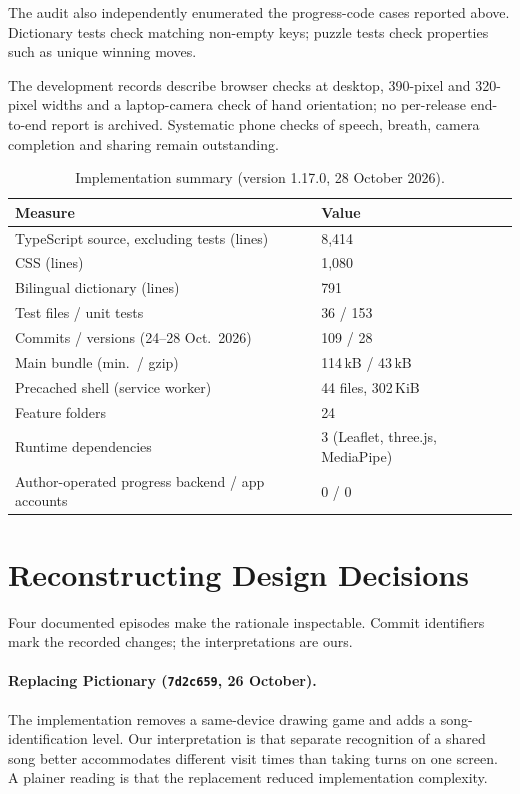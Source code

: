 \documentclass[sigconf,nonacm]{acmart}
\newcommand{\code}[1]{\textnormal{\texttt{\small #1}}}
\begin{document}
The audit also independently enumerated the progress-code cases reported above. Dictionary tests
check matching non-empty keys; puzzle tests check properties such as unique winning moves.

The development records describe browser checks at desktop, 390-pixel and 320-pixel widths and a
laptop-camera check of hand orientation; no per-release end-to-end report is archived. Systematic
phone checks of speech, breath, camera completion and sharing remain outstanding.

\begin{table}[t]
  \caption{Implementation summary (version 1.17.0, 28 October 2026).}
  \label{tab:metrics}
  \small
  \begin{tabular}{@{}p{}p{}@{}}
    \toprule
    Measure & Value \\
    \midrule
    TypeScript source, excluding tests (lines) & 8{,}414 \\
    CSS (lines) & 1{,}080 \\
    Bilingual dictionary (lines) & 791 \\
    Test files / unit tests & 36 / 153 \\
    Commits / versions (24--28 Oct.\ 2026) & 109 / 28 \\
    Main bundle (min.\ / gzip) & 114\,kB / 43\,kB \\
    Precached shell (service worker) & 44 files, 302\,KiB \\
    Feature folders & 24 \\
    Runtime dependencies & 3 (Leaflet, three.js, MediaPipe) \\
    Author-operated progress backend / app accounts & 0 / 0 \\
    \bottomrule
  \end{tabular}
\end{table}


\section{Reconstructing Design Decisions}\label{sec:log}
Four documented episodes make the rationale inspectable. Commit identifiers mark the recorded
changes; the interpretations are ours.

\paragraph{Replacing Pictionary (\code{7d2c659}, 26 October).}
The implementation removes a same-device drawing game and adds a song-identification level.
Our interpretation is that separate recognition of a shared song better accommodates different
visit times than taking turns on one screen. A plainer reading is that the replacement reduced
implementation complexity.
\end{document}
